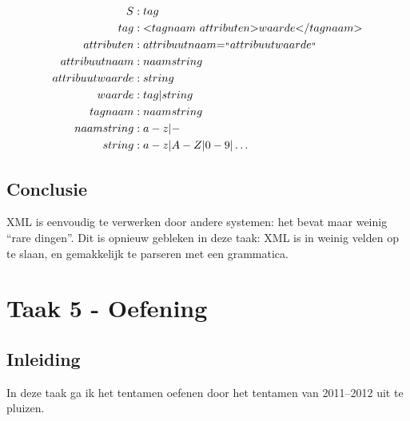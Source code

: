\documentclass[11pt]{article}
\begin{document}
\begin{align*}
S               & : tag                                                                                                           \\ 
tag             & : \text{\textless} tagnaam\  attributen \text{\textgreater} waarde \text{\textless/}tagnaam \text{\textgreater} \\ 
attributen      & : attribuutnaam \text{=}^\text{\textquotestraightdblbase} attribuutwaarde ^\text{\textquotestraightdblbase}     \\ 
attribuutnaam   & : naamstring                                                                                                    \\ 
attribuutwaarde & : string                                                                                                        \\ 
waarde          & : tag | string                                                                                                  \\ 
tagnaam         & : naamstring                                                                                                    \\ 
naamstring      & : a-z | -                                                                                                       \\ 
string          & : a-z | A-Z | 0-9 | \dots                                                                                       \\ 
\end{align*}

\subsection{Conclusie}

XML is eenvoudig te verwerken door andere systemen: het bevat maar weinig
``rare dingen''. Dit is opnieuw gebleken in deze taak: XML is in weinig velden
op te slaan, en gemakkelijk te parseren met een grammatica. 

\section{Taak 5 - Oefening}

\subsection{Inleiding}
In deze taak ga ik het tentamen oefenen door het tentamen van 2011--2012\cite{tentamen2011} uit te 
pluizen. 
\end{document}
